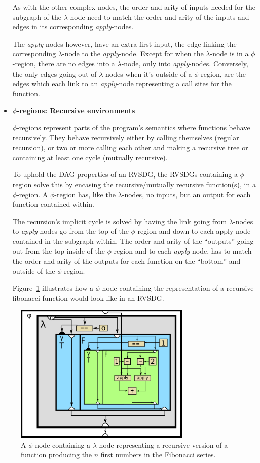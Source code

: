\begin{itemize}
As with the other complex nodes, the order and arity of inputs needed for the
subgraph of the $\lambda$-node need to match the order and arity of the inputs
and edges in its corresponding \textit{apply}-nodes.

The \textit{apply}-nodes however, have an extra first input, the edge linking
the corresponding $\lambda$-node to the \textit{apply}-node. Except for when the
$\lambda$-node is in a $\phi$-region, there are no edges into a $\lambda$-node,
only into \textit{apply}-nodes. Conversely, the only edges going out of
$\lambda$-nodes when it's outside of a $\phi$-region, are the edges which each
link to an \textit{apply}-node representing a call sites for the function.

\item \textbf{$\phi$-regions: Recursive environments}

\textit{$\phi$}-regions represent parts of the program's semantics where
functions behave recursively. They behave recursively either by calling
themselves (regular recursion), or two or more calling each other and making a
recursive tree or containing at least one cycle (mutually recursive).

To uphold the DAG properties of an RVSDG, the RVSDGs containing a $\phi$-region
solve this by encasing the recursive/mutually recursive function(s), in a
$\phi$-region. A $\phi$-region has, like the $\lambda$-nodes, no inputs, but an
output for each function contained within.

The recursion's implicit cycle is solved by having the link going from
$\lambda$-nodes to  \textit{apply}-nodes go from the top of the $\phi$-region
and down to each apply node contained in the subgraph within. The order and
arity of the ``outputs'' going out from the top inside of the $\phi$-region and
to each \textit{apply}-node, has to match the order and arity of the outputs for
each function on the ``bottom'' and outside of the $\phi$-region.

Figure~\ref{fig:rec_fib_phi} illustrates how a $\phi$-node containing the
representation of a recursive fibonacci function would look like in an RVSDG.

\end{itemize}


\begin{figure}[h!]
	\centering
	\includegraphics[width=0.75\textwidth]{figures/recursive_fibonacci}
	\caption{A $\phi$-node containing a $\lambda$-node representing a recursive
version of a function producing the $n$ first numbers in the Fibonacci series.}
	\label{fig:rec_fib_phi}
\end{figure}
